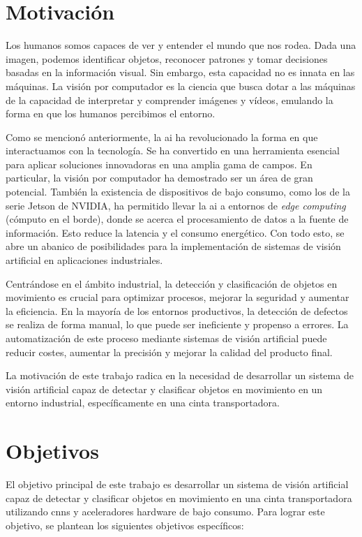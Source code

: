 \documentclass[11pt,spanish,listoffigures,listoftables]{tfgetsinf}
\begin{document}
\section{Motivaci\'on}\label{sec:motivacion}

Los humanos somos capaces de ver y entender el mundo que nos rodea. Dada una imagen, podemos identificar objetos, reconocer patrones y tomar decisiones basadas en la información visual. Sin embargo, esta capacidad no es innata en las máquinas. La visión por computador es la ciencia que busca dotar a las máquinas de la capacidad de interpretar y comprender imágenes y vídeos, emulando la forma en que los humanos percibimos el entorno.

Como se mencionó anteriormente, la \gls{ai} ha revolucionado la forma en que interactuamos con la tecnología. Se ha convertido en una herramienta esencial para aplicar soluciones innovadoras en una amplia gama de campos. En particular, la visión por computador ha demostrado ser un área de gran potencial. También la existencia de dispositivos de bajo consumo, como los de la serie Jetson de NVIDIA, ha permitido llevar la \gls{ai} a entornos de \textit{edge computing} (cómputo en el borde), donde se acerca el procesamiento de datos a la fuente de información. Esto reduce la latencia y el consumo energético. Con todo esto, se abre un abanico de posibilidades para la implementación de sistemas de visión artificial en aplicaciones industriales.

Centrándose en el ámbito industrial, la detección y clasificación de objetos en movimiento es crucial para optimizar procesos, mejorar la seguridad y aumentar la eficiencia. En la mayoría de los entornos productivos, la detección de defectos se realiza de forma manual, lo que puede ser ineficiente y propenso a errores. La automatización de este proceso mediante sistemas de visión artificial puede reducir costes, aumentar la precisión y mejorar la calidad del producto final.


La motivación de este trabajo radica en la necesidad de desarrollar un sistema de visión artificial capaz de detectar y clasificar objetos en movimiento en un entorno industrial, específicamente en una cinta transportadora.


\section{Objetivos}\label{sec:objetivos}

El objetivo principal de este trabajo es desarrollar un sistema de visión artificial capaz de detectar y clasificar objetos en movimiento en una cinta transportadora utilizando \glspl{cnn} y aceleradores hardware de bajo consumo. Para lograr este objetivo, se plantean los siguientes objetivos específicos:
\end{document}
